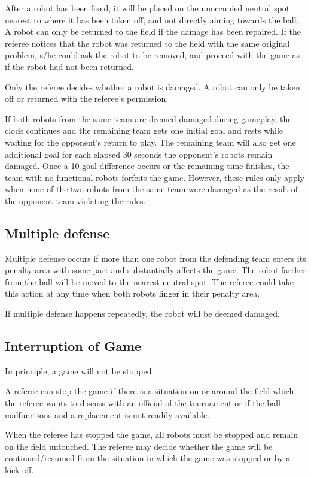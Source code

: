 \documentclass{article}
\begin{document}
After a robot has been fixed, it will be placed on the unoccupied neutral spot
nearest to where it has been taken off, and not directly aiming towards the
ball. A robot can only be returned to the field if the damage has been
repaired. If the referee notices that the robot was returned to the field with
the same original problem, s/he could ask the robot to be removed, and proceed
with the game as if the robot had not been returned.

Only the referee decides whether a robot is damaged. A robot can only be taken
off or returned with the referee's permission.

If both robots from the same team are deemed damaged during gameplay, the clock
continues and the remaining team gets one initial goal and rests while waiting
for the opponent's return to play. The remaining team will also get one
additional goal for each elapsed 30 seconds the opponent's robots remain
damaged. Once a 10 goal difference occurs or the remaining time finishes, the
team with no functional robots forfeits the game. However, these rules only
apply when none of the two robots from the same team were damaged as the result
of the opponent team violating the rules.

\subsection{Multiple defense \label{ref-013}}

Multiple defense occurs if more than one robot from the defending team enters
its penalty area with some part and substantially affects the game. The robot
farther from the ball will be moved to the nearest neutral spot. The referee
could take this action at any time when both robots linger in their penalty
area.

If multiple defense happens repeatedly, the robot will be deemed damaged.

\subsection{Interruption of Game \label{ref-014}}

In principle, a game will not be stopped.

A referee can stop the game if there is a situation on or around the field
which the referee wants to discuss with an official of the tournament or if the
ball malfunctions and a replacement is not readily available.

When the referee has stopped the game, all robots must be stopped and remain on
the field untouched. The referee may decide whether the game will be
continued/resumed from the situation in which the game was stopped or by a
kick-off.
\end{document}
